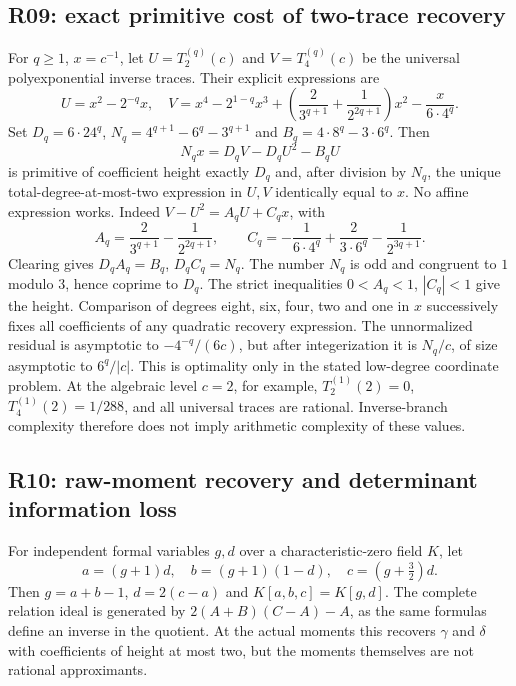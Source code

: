 \documentclass[11pt,a4paper]{article}
\theoremstyle{definition}
\theoremstyle{remark}
\numberwithin{equation}{section}
\begin{document}
\subsection{R09: exact primitive cost of two-trace recovery}
For $q\ge1$, $x=c^{-1}$, let $U=T_2^{(q)}(c)$ and $V=T_4^{(q)}(c)$ be
the universal polyexponential inverse traces.  Their explicit expressions
are
\[
 U=x^2-2^{-q}x,
\quad V=x^4-2^{1-q}x^3+
 \left(\frac2{3^{q+1}}+\frac1{2^{2q+1}}\right)x^2-\frac{x}{6\cdot4^q}.
\]
Set $D_q=6\cdot24^q$, $N_q=4^{q+1}-6^q-3^{q+1}$ and
$B_q=4\cdot8^q-3\cdot6^q$.  Then
\begin{equation}\label{ar:tracerecovery}
 N_qx=D_qV-D_qU^2-B_qU
\end{equation}
is primitive of coefficient height exactly $D_q$ and, after division by
$N_q$, the unique total-degree-at-most-two expression in $U,V$ identically
equal to $x$.  No affine expression works.
Indeed $V-U^2=A_qU+C_qx$, with
\[
 A_q=\frac2{3^{q+1}}-\frac1{2^{2q+1}},\qquad
 C_q=-\frac1{6\cdot4^q}+\frac2{3\cdot6^q}-\frac1{2^{3q+1}}.
\]
Clearing gives $D_qA_q=B_q$, $D_qC_q=N_q$.  The number $N_q$ is odd
and congruent to $1$ modulo $3$, hence coprime to $D_q$.
The strict inequalities $0<A_q<1$, $|C_q|<1$ give the height.
Comparison of degrees eight, six, four, two and one in $x$ successively
fixes all coefficients of any quadratic recovery expression.
The unnormalized residual is asymptotic to $-4^{-q}/(6c)$, but after
integerization it is $N_q/c$, of size asymptotic to $6^q/|c|$.
This is optimality only in the stated low-degree coordinate problem.
At the algebraic level $c=2$, for example,
$T_2^{(1)}(2)=0$, $T_4^{(1)}(2)=1/288$, and all universal traces are
rational.  Inverse-branch complexity therefore does not imply arithmetic
complexity of these values.

\subsection{R10: raw-moment recovery and determinant information loss}
For independent formal variables $g,d$ over a characteristic-zero field
$K$, let
\[
 a=(g+1)d,\quad b=(g+1)(1-d),\quad c=(g+\tfrac32)d.
\]
Then $g=a+b-1$, $d=2(c-a)$ and $K[a,b,c]=K[g,d]$.
The complete relation ideal is generated by $2(A+B)(C-A)-A$, as the
same formulas define an inverse in the quotient.  At the actual moments
this recovers $\gamma$ and $\delta$ with coefficients of height at most
two, but the moments themselves are not rational approximants.
\end{document}

